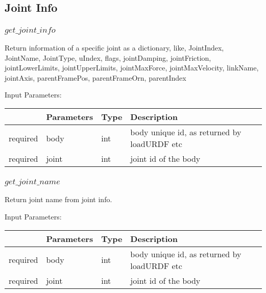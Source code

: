 \documentclass[
	ngerman,
	accentcolor=9c,%
	type=intern,
	marginpar=false
	]{tudapub}
\begin{document}
\subsection{Joint Info}

\subsubsection{$get\_joint\_info$}
\noindent Return information of a specific joint as a dictionary, like, JointIndex, JointName, JointType, uIndex, flags, jointDamping, jointFriction, jointLowerLimits, jointUpperLimits,
    jointMaxForce, jointMaxVelocity, linkName, jointAxis, parentFramePos, parentFrameOrn, parentIndex
    




\vspace{0.5cm}
\noindent Input Parameters:
\vspace{0.5cm}

\begin{tabular}{|p{}|p{}|p{}| p{}|}
\hline
 & \textbf{Parameters} & \textbf{Type} & \textbf{Description} \\
\hline
required & body & int & body unique id, as returned by loadURDF etc\\
\hline
required & joint & int & joint id of the body\\
\hline
\end{tabular}
\vspace{0.5cm}




\subsubsection{$get\_joint\_name$}
\noindent Return joint name from joint info.




\vspace{0.5cm}
\noindent Input Parameters:
\vspace{0.5cm}

\begin{tabular}{|p{}|p{}|p{}| p{}|}
\hline
 & \textbf{Parameters} & \textbf{Type} & \textbf{Description} \\
\hline
required & body & int & body unique id, as returned by loadURDF etc\\
\hline
required & joint & int & joint id of the body\\
\hline
\end{tabular}
\vspace{0.5cm}
\end{document}
